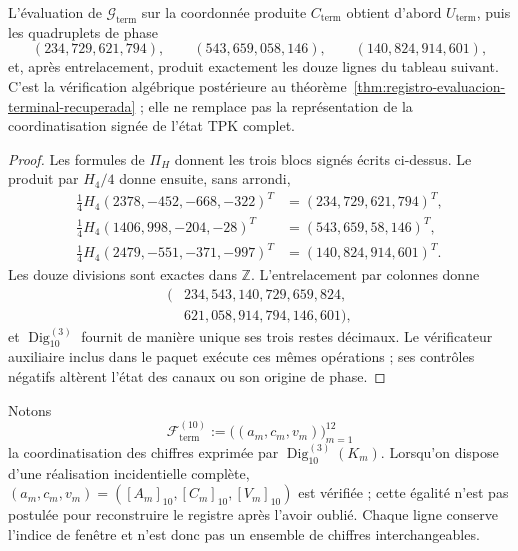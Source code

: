 \begin{proposition}
\label{prop:registro-generacion-modular-terminal}
L'évaluation de \(\mathcal G_{\mathrm{term}}\) sur la coordonnée produite \(C_{\mathrm{term}}\) obtient d'abord \(U_{\mathrm{term}}\), puis les quadruplets de phase
\[
 (234,729,621,794),\qquad(543,659,058,146),\qquad
 (140,824,914,601),
\]
et, après entrelacement, produit exactement les douze lignes du tableau suivant. C'est la vérification algébrique postérieure au théorème~\ref{thm:registro-evaluacion-terminal-recuperada} ; elle ne remplace pas la représentation de la coordinatisation signée de l'état TPK complet.
\end{proposition}

\begin{proof}
Les formules de \(\Pi_H\) donnent les trois blocs signés écrits ci-dessus. Le produit par \(H_4/4\) donne ensuite, sans arrondi,
\begin{align*}
 \tfrac14H_4(2378,-452,-668,-322)^T&=(234,729,621,794)^T,\\
 \tfrac14H_4(1406,998,-204,-28)^T&=(543,659,58,146)^T,\\
 \tfrac14H_4(2479,-551,-371,-997)^T&=(140,824,914,601)^T.
\end{align*}
Les douze divisions sont exactes dans \(\mathbb Z\). L’entrelacement par colonnes donne
\[
 \begin{split}
 (&234,543,140,729,659,824,\\
  &621,058,914,794,146,601),
 \end{split}
\]
et \(\operatorname{Dig}_{10}^{(3)}\) fournit de manière unique ses trois
restes décimaux. Le vérificateur auxiliaire inclus dans le paquet exécute
ces mêmes opérations ; ses contrôles négatifs altèrent l’état des canaux
ou son origine de phase.
\end{proof}

Notons
\[
 \mathscr F_{\mathrm{term}}^{(10)}
 :=\bigl((a_m,c_m,v_m)\bigr)_{m=1}^{12}
\]
la coordinatisation des chiffres exprimée par \(\operatorname{Dig}_{10}^{(3)}(K_m)\). Lorsqu'on dispose d'une réalisation incidentielle complète, \((a_m,c_m,v_m)=([A_m]_{10},[C_m]_{10},[V_m]_{10})\) est vérifiée ; cette égalité n'est pas postulée pour reconstruire le registre après l'avoir oublié. Chaque ligne conserve l'indice de fenêtre et n'est donc pas un ensemble de chiffres interchangeables.

